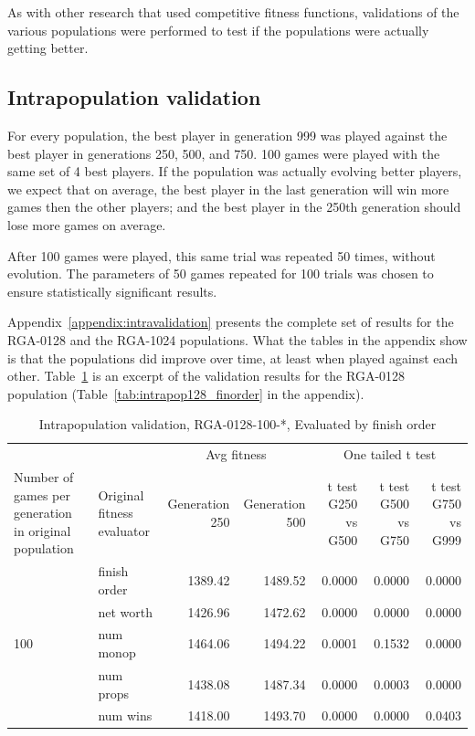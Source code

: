 As with other research that used competitive fitness functions, validations of
the various populations were performed to test if the populations were actually
getting better.

\subsection{Intrapopulation validation}

For every population, the best player in generation 999 was played against
the best player in generations 250, 500, and 750. 100 games were played with the
same set of 4 best players. If the population was actually evolving better
players, we expect that on average, the best player in the last generation will
win more games then the other players; and the best player in the 250th
generation should lose more games on average.

After 100 games were played, this same trial was repeated 50 times, without
evolution. The parameters of 50 games repeated for 100 trials was chosen to
ensure statistically significant results.

Appendix~\ref{appendix:intravalidation} presents the complete set of results for
the RGA-0128 and the RGA-1024 populations. What the tables in the appendix show
is that the populations did improve over time, at least when played against each
other. Table~\ref{tab:validationRGA0128} is an excerpt of the validation results
for the RGA-0128 population (Table~\ref{tab:intrapop128_finorder} in the
appendix).

\begin{table}[htbp]
  \centering
  \caption{Intrapopulation validation, RGA-0128-100-*, Evaluated by finish
  order}
    \begin{tabularx}{\linewidth}{|p{1in}|p{1in}|r|r|r|r|r|}
    \cline{3-7}
    \multicolumn{1}{l}{} &  & \multicolumn{2}{c|}{Avg fitness} & \multicolumn{3}{c|}{One tailed t test} \\
    \cline{1-7}
    Number of games per generation in original population
    & Original fitness evaluator
    & \multicolumn{1}{p{0.7in}|}{Generation 250}
    & \multicolumn{1}{p{0.7in}|}{Generation 500}
    & \multicolumn{1}{X|}{t test G250 vs G500}
    & \multicolumn{1}{X|}{t test G500 vs G750}
    & \multicolumn{1}{X|}{t test G750 vs G999} \\
    \cline{1-7}
      \multirow{5}{*}{100}
      & finish order & 1389.42 & 1489.52 & 0.0000 & 0.0000 & 0.0000 \\
      \cline{2-7}
      & net worth & 1426.96 & 1472.62 & 0.0000 & 0.0000 & 0.0000 \\
      \cline{2-7}
      & num monop & 1464.06 & 1494.22 & 0.0001 & 0.1532 & 0.0000 \\
      \cline{2-7}
      & num props & 1438.08 & 1487.34 & 0.0000 & 0.0003 & 0.0000 \\
      \cline{2-7}
      & num wins & 1418.00 & 1493.70 & 0.0000 & 0.0000 & 0.0403 \\
      \cline{1-7}
    \end{tabularx}%
  \label{tab:validationRGA0128}%
\end{table}%

